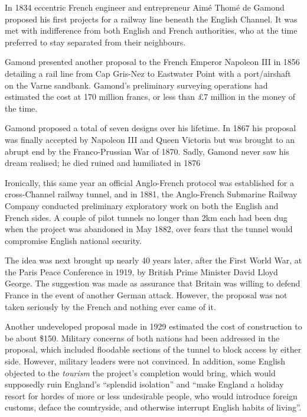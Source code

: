 \documentclass[12pt]{article} %
\begin{document}
In 1834 eccentric French engineer and entrepreneur Aimé Thomé de Gamond proposed his first projects for a railway line beneath the English Channel. It was met with indifference from both English and French authorities, who at the time preferred to stay separated from their neighbours.

Gamond presented another proposal to the French Emperor Napoleon III in 1856 detailing a rail line from Cap Gris-Nez to Eastwater Point with a port\slash airshaft on the Varne sandbank. Gamond's preliminary surveying operations had estimated the cost at 170 million francs, or less than £7 million in the money of the time.\cite{ny-gamond}

Gamond proposed a total of seven designs over his lifetime. In 1867 his proposal was finally accepted by Napoleon III and Queen Victoria but was brought to an abrupt end by the Franco-Prussian War of 1870. Sadly, Gamond never saw his dream realised; he died ruined and humiliated in 1876\cite{gamond}

Ironically, this same year an official Anglo-French protocol was established for a cross-Channel railway tunnel\cite{bris}, and in 1881, the Anglo-French Submarine Railway Company conducted preliminary exploratory work on both the English and French sides. A couple of pilot tunnels no longer than 2km each had been dug when the project was abandoned in May 1882, over fears that the tunnel would compromise English national security.

The idea was next brought up nearly 40 years later, after the First World War, at the Paris Peace Conference in 1919, by British Prime Minister David Lloyd George. The suggestion was made as assurance that Britain was willing to defend France in the event of another German attack. However, the proposal was not taken seriously by the French and nothing ever came of it.

Another undeveloped proposal made in 1929 estimated the cost of construction to be about \$150. Military concerns of both nations had been addressed in the proposal, which included floodable sections of the tunnel to block access by either side. However, military leaders were not convinced. In addition, some English objected to the \emph{tourism} the project's completion would bring, which would supposedly ruin England's ``splendid isolation'' and ``make England a holiday resort for hordes of more or less undesirable people, who would introduce foreign customs, deface the countryside, and otherwise interrupt English habits of living''.\cite{pop29}
\end{document}
